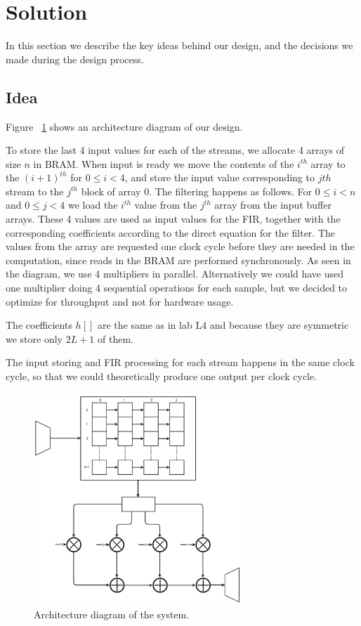\section{Solution}
In this section we describe the key ideas behind our design, and the decisions we made during the design process.
\subsection{Idea}

Figure ~\ref{fig:architecture} shows an architecture diagram of our design.

To store the last 4 input values for each of the streams,  we allocate 4 arrays of size $n$ in BRAM. When input is ready we move the contents of the $i^{th}$ array to the $(i+1)^{th}$ for $0 \leq i < 4$, and store the input value corresponding to $j{th}$ stream to the $j^{th}$ block of array 0. The filtering happens as follows. For $0 \leq  i < n$ and $0 \leq j < 4$ we load the $i^{th}$ value from the $j^{th}$ array from the input buffer arrays.  These 4 values are used as input values for the FIR, together with the corresponding coefficients according to the direct equation for the filter. The values from the array are requested one clock cycle before they are needed in the computation, since reads in the BRAM are performed synchronously. As seen in the diagram, we use 4 multipliers in parallel. Alternatively we could have used one multiplier doing 4 sequential operations for each sample, but we decided to optimize for throughput and not for hardware usage.

The coefficients $h[]$ are the same as in lab L4 and because they are symmetric we store only $2L+1$ of them.

The input storing and FIR processing for each stream happens in the same clock cycle, so that we could theoretically produce one output per clock cycle.
\begin{figure}
\begin{center}
\includegraphics[width=0.7\textwidth]{images/architecture.png}
\caption{Architecture diagram of the system.}
\label{fig:architecture}
\end{center}
\end{figure}
\FloatBarrier
